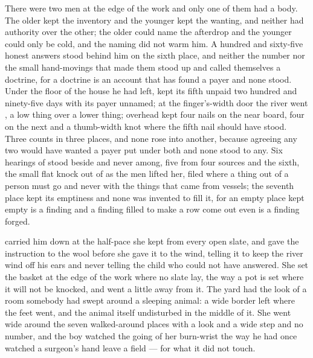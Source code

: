 There were two men at the edge of the work and only one of them had a body. The older kept the inventory and the younger kept the wanting, and neither had authority over the other; the older could name the afterdrop and the younger could only be cold, and the naming did not warm him. A hundred and sixty-five honest answers stood behind him on the sixth place, and neither the number nor the small hand-movings that made them stood up and called themselves a doctrine, for a doctrine is an account that has found a payer and none stood. Under the floor of the house he had left,  kept its fifth unpaid two hundred and ninety-five days with its payer unnamed; at the finger's-width door the river went , a low thing over a lower thing; overhead  kept four nails on the near board, four on the next and a thumb-width knot where the fifth nail should have stood. Three counts in three places, and none rose into another, because agreeing any two would have wanted a payer put under both and none stood to any. Six hearings of  stood beside and never among, five from four sources and the sixth, the small flat knock out of  as the men lifted her, filed where a thing out of a person must go and never with the things that came from vessels; the seventh place kept its emptiness and none was invented to fill it, for an empty place kept empty is a finding and a finding filled to make a row come out even is a finding forged.

\scenebreak

 carried him down at the half-pace she kept from every open slate, and gave the instruction to the wool before she gave it to the wind, telling it to keep the river wind off his ears and never telling the child who could not have answered. She set the basket at the edge of the work where no slate lay, the way a pot is set where it will not be knocked, and went a little away from it. The yard had the look of a room somebody had swept around a sleeping animal: a wide border left where the feet went, and the animal itself undisturbed in the middle of it. She went wide around the seven walked-around places with a look and a wide step and no number, and the boy watched the going of her burn-wrist the way he had once watched a surgeon's hand leave a field --- for what it did not touch.

